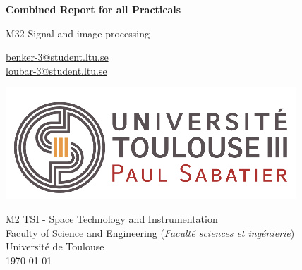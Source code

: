 \begin{titlepage}
    \begin{center}
    
        \vspace*{1cm}
        \Huge
        \textbf{
        Combined Report for all Practicals}
            
        \vspace{0.5cm}
        \LARGE
        M32 Signal and image processing

            
        \vspace{2cm}
        \Large
        \begin{flushleft}
                \tab\url{benker-3@student.ltu.se} \\
                  \tab\url{loubar-3@student.ltu.se}     
            
        \end{flushleft}
            
        \vfill
            
        \includegraphics[width=0.5\linewidth]{Graphics/Vignette logo.png}
        \vfill
   
        
        \begin{flushleft}
            \large
            M2 TSI - Space Technology and Instrumentation \\
            Faculty of Science and Engineering (\textit{Faculté sciences et ingénierie}) \\
            Université de Toulouse \\
            \today
        \end{flushleft}
                   
            
    \end{center}
\end{titlepage}